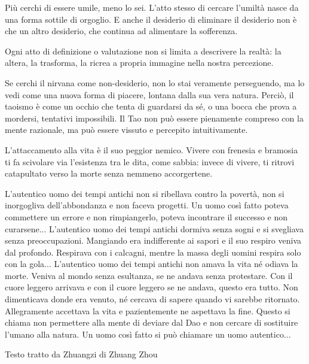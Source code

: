 \documentclass[12pt]{book} %
\begin{document}
Più cerchi di essere umile, meno lo sei. L’atto stesso di cercare l’umiltà nasce da una forma sottile di orgoglio.
E anche il desiderio di eliminare il desiderio non è che un altro desiderio, che continua ad alimentare la sofferenza.

Ogni atto di definizione o valutazione non si limita a descrivere la realtà: la altera, la trasforma, la ricrea a propria immagine nella nostra percezione.

Se cerchi il nirvana come non-desiderio, non lo stai veramente perseguendo, ma lo vedi come una nuova forma di piacere, lontana dalla sua vera natura. Perciò, il taoismo è come un occhio che tenta di guardarsi da sé, o una bocca che prova a mordersi, tentativi impossibili. Il Tao non può essere pienamente compreso con la mente razionale, ma può essere vissuto e percepito intuitivamente.

L’attaccamento alla vita è il suo peggior nemico.
Vivere con frenesia e bramosia ti fa scivolare via l’esistenza tra le dita, come sabbia: invece di vivere, ti ritrovi catapultato verso la morte senza nemmeno accorgertene.

\begin{mdframed}[linewidth=1pt]
L’autentico uomo dei tempi antichi non si ribellava contro la povertà, non si inorgogliva dell’abbondanza e non faceva progetti. Un uomo così fatto poteva commettere un errore e non rimpiangerlo, poteva incontrare il successo e non curarsene... L’autentico uomo dei tempi antichi dormiva senza sogni e si svegliava senza preoccupazioni. Mangiando era indifferente ai sapori e il suo respiro veniva dal profondo. Respirava con i calcagni, mentre la massa degli uomini respira solo con la gola... L’autentico uomo dei tempi antichi non amava la vita né odiava la morte. Veniva al mondo senza esultanza, se ne andava senza protestare. Con il cuore leggero arrivava e con il cuore leggero se ne andava, questo era tutto. Non dimenticava donde era venuto, né cercava di sapere quando vi sarebbe ritornato. Allegramente accettava la vita e pazientemente ne aspettava la fine. Questo si chiama non permettere alla mente di deviare dal Dao e non cercare di sostituire l’umano alla natura. Un uomo così fatto si può chiamare un uomo autentico...

Testo tratto da Zhuangzi di Zhuang Zhou 
\end{mdframed}
\end{document}
